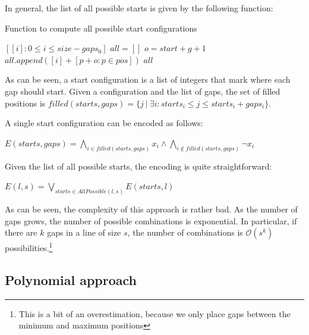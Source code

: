 \documentclass[12pt]{article}
\begin{document}
In general, the list of all possible starts is given by the following function:

\begin{algorithm}
\caption{Function to compute all possible start configurations}\label{alg:allPossible}
\begin{algorithmic}
    \State\Return$[ [i]: 0 \le i \le size - gaps_0]$
  \Else
    \State$all = []$
      \State$o = start + g + 1$ 
          \State $all.append([i] + [p + o: p \in pos])$
      \EndFor
    \EndFor
    \State \Return $all$
  \EndIf
\EndFunction
\end{algorithmic}
\end{algorithm}

As can be seen, a start configuration is a list of integers that mark where each gap should start.
Given a configuration and the list of gaps, the set of filled positions is $filled(starts, gaps) = \{j\ |\ \exists i: starts_i \le j \le starts_i + gaps_i\}$.

A single start configuration can be encoded as follows:

\begin{center}
  $E(starts, gaps) = \bigwedge\limits_{i \in filled(starts, gaps)}x_i \wedge \bigwedge\limits_{i \notin filled(starts, gaps)} \neg x_i$
\end{center}

\noindent Given the list of all possible starts, the encoding is quite straightforward:

\begin{center}
  $E(l, s) = \bigvee_{starts \in AllPossible(l, s)} E(starts, l)$
\end{center}

\noindent As can be seen, the complexity of this approach is rather bad. As the number of gaps grows, the number of possible combinations is exponential. In particular, if there are $k$ gaps in a line of size $s$, the number of combinations is $\mathcal{O}(s^k)$ possibilities.\footnote{This is a bit of an overestimation, because we only place gaps between the minimum and maximum positions}

\subsection*{Polynomial approach}
\end{document}
